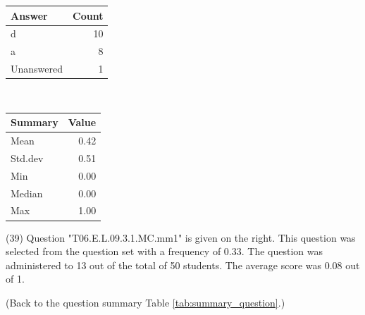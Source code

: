 \documentclass[12pt,english,nohyper]{tufte-handout}\usepackage[]{graphicx}\usepackage[]{color}
\begin{document}
\begin{center}%
\begin{tabular}{lr}
  \hline
Answer & Count \\ 
  \hline
d &  10 \\ 
  a &   8 \\ 
  Unanswered &   1 \\ 
   \hline
\end{tabular}
~~~~~~~~%
\begin{tabular}{lr}
  \hline
Summary & Value \\ 
  \hline
Mean & 0.42 \\ 
  Std.dev & 0.51 \\ 
  Min & 0.00 \\ 
  Median & 0.00 \\ 
  Max & 1.00 \\ 
   \hline
\end{tabular}
\end{center}\newpage{} (39) Question "T06.E.L.09.3.1.MC.mm1" is given on the right. This question was selected from the question set with a frequency of 0.33. The question was administered to 13 out of the total of 50 students. The average score was 0.08 out of 1.

 (Back to the question summary Table \ref{tab:summary_question}.)
\end{document}
